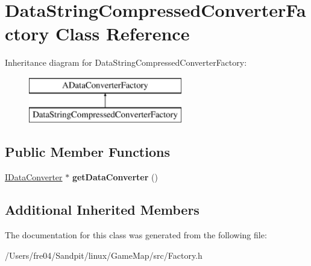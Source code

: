 \hypertarget{class_data_string_compressed_converter_factory}{}\section{Data\+String\+Compressed\+Converter\+Factory Class Reference}
\label{class_data_string_compressed_converter_factory}
Inheritance diagram for Data\+String\+Compressed\+Converter\+Factory\+:\begin{figure}[H]
\begin{center}
\leavevmode
\includegraphics[height=2.000000cm]{class_data_string_compressed_converter_factory}
\end{center}
\end{figure}
\subsection*{Public Member Functions}
\begin{DoxyCompactItemize}
\item 
\hypertarget{class_data_string_compressed_converter_factory_aac9754fea865458de1ea632b04b60216}{}\hyperlink{class_i_data_converter}{I\+Data\+Converter} $\ast$ {\bfseries get\+Data\+Converter} ()\label{class_data_string_compressed_converter_factory_aac9754fea865458de1ea632b04b60216}

\end{DoxyCompactItemize}
\subsection*{Additional Inherited Members}


The documentation for this class was generated from the following file\+:\begin{DoxyCompactItemize}
\item 
/\+Users/fre04/\+Sandpit/linux/\+Game\+Map/src/Factory.\+h\end{DoxyCompactItemize}
